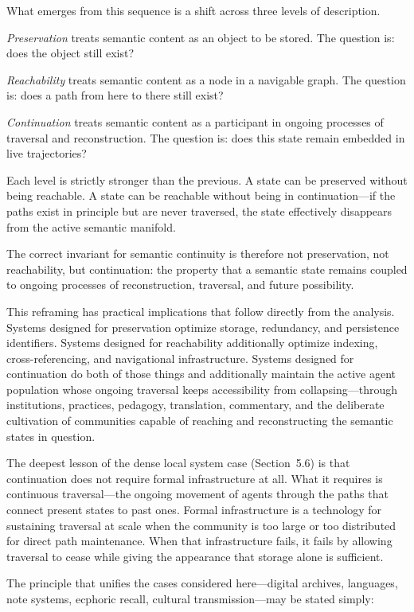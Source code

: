 \documentclass[12pt]{article}
\begin{document}
What emerges from this sequence is a shift across three levels of description.

\emph{Preservation} treats semantic content as an object to be stored.
The question is: does the object still exist?

\emph{Reachability} treats semantic content as a node in a navigable graph.
The question is: does a path from here to there still exist?

\emph{Continuation} treats semantic content as a participant in ongoing
processes of traversal and reconstruction.
The question is: does this state remain embedded in live trajectories?

Each level is strictly stronger than the previous.
A state can be preserved without being reachable.
A state can be reachable without being in continuation---if the paths
exist in principle but are never traversed, the state effectively disappears
from the active semantic manifold.

The correct invariant for semantic continuity is therefore not preservation,
not reachability, but continuation: the property that a semantic state
remains coupled to ongoing processes of reconstruction, traversal, and
future possibility.

This reframing has practical implications that follow directly from the
analysis.
Systems designed for preservation optimize storage, redundancy, and
persistence identifiers.
Systems designed for reachability additionally optimize indexing,
cross-referencing, and navigational infrastructure.
Systems designed for continuation do both of those things and additionally
maintain the active agent population whose ongoing traversal keeps
accessibility from collapsing---through institutions, practices, pedagogy,
translation, commentary, and the deliberate cultivation of communities
capable of reaching and reconstructing the semantic states in question.

The deepest lesson of the dense local system case (Section~5.6) is that
continuation does not require formal infrastructure at all.
What it requires is continuous traversal---the ongoing movement of agents
through the paths that connect present states to past ones.
Formal infrastructure is a technology for sustaining traversal at scale
when the community is too large or too distributed for direct path
maintenance.
When that infrastructure fails, it fails by allowing traversal to cease
while giving the appearance that storage alone is sufficient.

The principle that unifies the cases considered here---digital archives,
languages, note systems, ecphoric recall, cultural transmission---may be
stated simply:
\end{document}
